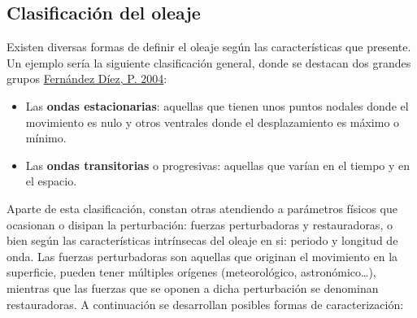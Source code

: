 \subsection{Clasificación del oleaje}\label{header-n60}

Existen diversas formas de definir el oleaje según las características
que presente. Un ejemplo sería la siguiente clasificación general, donde
se destacan dos grandes grupos
\href{http://es.pfernandezdiez.es/index.php?pageID=15}{Fernández Díez,
P. 2004}:

\begin{itemize}
\item
  Las \textbf{ondas estacionarias}: aquellas que tienen unos puntos
  nodales donde el movimiento es nulo y otros ventrales donde el
  desplazamiento es máximo o mínimo.
\item
  Las \textbf{ondas transitorias} o progresivas: aquellas que varían en
  el tiempo y en el espacio.
\end{itemize}

Aparte de esta clasificación, constan otras atendiendo a parámetros
físicos que ocasionan o disipan la perturbación: fuerzas perturbadoras y
restauradoras, o bien según las características intrínsecas del oleaje
en si: periodo y longitud de onda. Las fuerzas perturbadoras son
aquellas que originan el movimiento en la superficie, pueden tener
múltiples orígenes (meteorológico, astronómico\ldots{}), mientras que
las fuerzas que se oponen a dicha perturbación se denominan
restauradoras. A continuación se desarrollan posibles formas de
caracterización:


